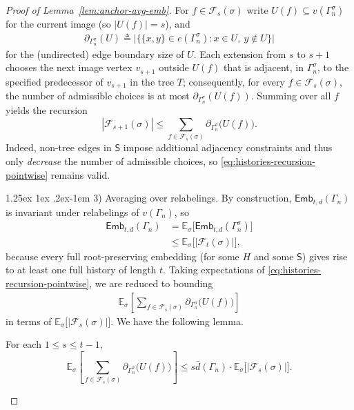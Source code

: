 \documentclass[10pt,a4paper]{amsart}
\makeatletter
\renewcommand{\paragraph}{%
  \@startsection{paragraph}{4}%
  {\z@}{1.25ex \@plus 1ex \@minus .2ex}{-1em}%
  {\normalfont\normalsize\bfseries}%
}
\newcommand{\s}[1]{\mathsf{#1}}
\makeatother
\begin{document}
\begin{proof}[Proof of Lemma~\ref{lem:anchor-avg-emb}]
For $f\in\mathcal F_s(\sigma)$ write $U(f)\subseteq v(\Gamma_n^\sigma)$ for the current image (so $|U(f)|=s$), and
\begin{align}
\partial_{\Gamma_n^\sigma}(U)\triangleq\big|\{  \{x,y\}\in e(\Gamma_n^\sigma): x\in U,\ y\notin U  \}\big|
\end{align}
for the (undirected) edge boundary size of $U$.
Each extension from $s$ to $s+1$ chooses the next image vertex $v_{s+1}$ outside $U(f)$ that is adjacent, in $\Gamma_n^\sigma$, to the specified predecessor of $v_{s+1}$ in the tree $T$; consequently, for every $f\in\mathcal F_s(\sigma)$,
the number of admissible choices is at most $\partial_{\Gamma_n^\sigma}(U(f))$.
Summing over all $f$ yields the recursion
\begin{equation}\label{eq:histories-recursion-pointwise}
|\mathcal F_{s+1}(\sigma)|
\leq \sum_{f\in\mathcal F_s(\sigma)} \partial_{\Gamma_n^\sigma}\big(U(f)\big).
\end{equation}
Indeed, non-tree edges in $\mathsf S$ impose additional adjacency constraints and thus only \emph{decrease} the number of admissible choices, so \eqref{eq:histories-recursion-pointwise} remains valid.

\paragraph{3) Averaging over relabelings.}
By construction, $\s{Emb}_{t,d}(\Gamma_n)$ is invariant under relabelings of $v(\Gamma_n)$, so
\begin{align}
\s{Emb}_{t,d}(\Gamma_n)&=\mathbb E_\sigma\big[\s{Emb}_{t,d}(\Gamma_n^\sigma)\big]\\
&\leq \mathbb E_\sigma\big[  |\mathcal F_t(\sigma)|  \big],
\end{align}
because every full root-preserving embedding (for some $H$ and some $\mathsf S$) gives rise to at least one full history of length $t$.
Taking expectations of \eqref{eq:histories-recursion-pointwise}, we are reduced to bounding
\begin{align}
\mathbb E_\sigma\left[\sum_{f\in\mathcal F_s(\sigma)} \partial_{\Gamma_n^\sigma}\big(U(f)\big)\right]
\end{align}
in terms of $\mathbb E_\sigma\big[  |\mathcal F_s(\sigma)|  \big]$. We have the following lemma.

\begin{lemma}\label{cl:avg-boundary}
For each $1\le s\le t-1$,
\begin{equation}\label{eq:avg-boundary}
\mathbb E_\sigma\left[\sum_{f\in\mathcal F_s(\sigma)} \partial_{\Gamma_n^\sigma}\big(U(f)\big)\right]
\leq 
s  \bar{d}(\Gamma_n)\cdot \mathbb E_\sigma\big[  |\mathcal F_s(\sigma)|  \big].
\end{equation}
\end{lemma}


\end{proof}
\end{document}
